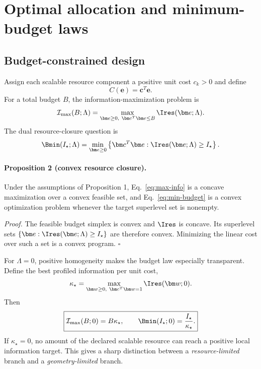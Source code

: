 \section{Optimal allocation and minimum-budget laws}
\label{sec:allocation}

\subsection{Budget-constrained design}

Assign each scalable resource component a positive unit cost $c_k>0$ and define
\begin{equation}
 C(\bm e)=\bm c^T\bm e.
\end{equation}
For a total budget $B$, the information-maximization problem is
\begin{equation}
 \mathcal I_{\max}(B;\Lambda)
 =
 \max_{\bm e\ge0,\ \bm c^T\bm e\le B}
 \Ires(\bm e;\Lambda).
\label{eq:max-info}
\end{equation}
The dual resource-closure question is
\begin{equation}
 \Bmin(I_\star;\Lambda)
 =
 \min_{\bm e\ge0}
 \left\{
 \bm c^T\bm e:
 \Ires(\bm e;\Lambda)\ge I_\star
 \right\}.
\label{eq:min-budget}
\end{equation}

\paragraph*{Proposition 2 (convex resource closure).}
Under the assumptions of Proposition 1, Eq.~\eqref{eq:max-info} is a concave maximization over a convex feasible set, and Eq.~\eqref{eq:min-budget} is a convex optimization problem whenever the target superlevel set is nonempty.

\emph{Proof.}
The feasible budget simplex is convex and $\Ires$ is concave. Its superlevel sets
$\{\bm e:\Ires(\bm e;\Lambda)\ge I_\star\}$ are therefore convex. Minimizing the linear cost over such a set is a convex program. \hfill$\square$

For $\Lambda=0$, positive homogeneity makes the budget law especially transparent. Define the best profiled information per unit cost,
\begin{equation}
 \kappa_\star
 =
 \max_{\bm w\ge0,\ \bm c^T\bm w=1}
 \Ires(\bm w;0).
\label{eq:kappa}
\end{equation}
Then
\begin{equation}
 \boxed{
 \mathcal I_{\max}(B;0)=B\kappa_\star,
 \qquad
 \Bmin(I_\star;0)=\frac{I_\star}{\kappa_\star}.
 }
\label{eq:budget-law}
\end{equation}
If $\kappa_\star=0$, no amount of the declared scalable resource can reach a positive local information target. This gives a sharp distinction between a \emph{resource-limited} branch and a \emph{geometry-limited} branch.

